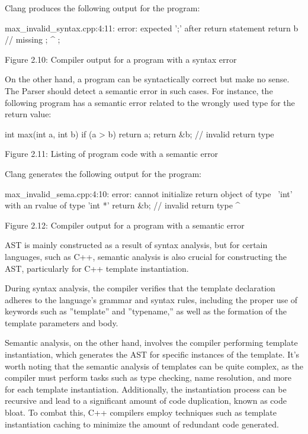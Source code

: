 Clang produces the following output for the program:

\begin{shell}
max_invalid_syntax.cpp:4:11: error: expected ’;’ after return statement
  return b // missing ;
          ^
          ;
\end{shell}

\begin{center}
Figure 2.10: Compiler output for a program with a syntax error
\end{center}

On the other hand, a program can be syntactically correct but make no sense. The Parser should detect a semantic error in such cases. For instance, the following program has a semantic error related to the wrongly used type for the return value:

\begin{cpp}
int max(int a, int b) {
  if (a > b)
    return a;
  return &b; // invalid return type
}
\end{cpp}

\begin{center}
Figure 2.11: Listing of program code with a semantic error
\end{center}

Clang generates the following output for the program:

\begin{shell}
max_invalid_sema.cpp:4:10: error: cannot initialize return object of type \
’int’ with an rvalue of type ’int *’
  return &b; // invalid return type
         ^~
\end{shell}

\begin{center}
Figure 2.12: Compiler output for a program with a semantic error
\end{center}

AST is mainly constructed as a result of syntax analysis, but for certain languages, such as C++, semantic analysis is also crucial for constructing the AST, particularly for C++ template instantiation.

During syntax analysis, the compiler verifies that the template declaration adheres to the language’s grammar and syntax rules, including the proper use of keywords such as ”template” and ”typename,” as well as the formation of the template parameters and body.

Semantic analysis, on the other hand, involves the compiler performing template instantiation, which generates the AST for specific instances of the template. It’s worth noting that the semantic analysis of templates can be quite complex, as the compiler must perform tasks such as type checking, name resolution, and more for each template instantiation. Additionally, the instantiation process can be recursive and lead to a significant amount of code duplication, known as code bloat. To combat this, C++ compilers employ techniques such as template instantiation caching to minimize the amount of redundant code generated.


